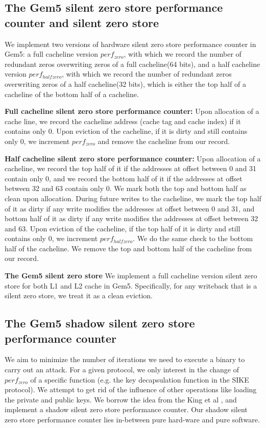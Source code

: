 \documentclass{iacrtrans}
\begin{document}
\subsection{The Gem5 silent zero store performance counter and silent zero store} 
We implement two versions of hardware silent zero store performance counter in Gem5: a full cacheline version $perf_{zero}$, with which we record the number of redundant zeros overwriting zeros of a full cacheline(64 bits), and a half cacheline version $perf_{halfzero}$, with which we record the number of redundant zeros overwriting zeros of a half cacheline(32 bits), which is either the top half of a cacheline of the bottom half of a cacheline.

\textbf{Full cacheline silent zero store performance counter: }Upon allocation of a cache line, we record the cacheline address (cache tag and cache index) if it contains only 0. Upon eviction of the cacheline, if it is dirty and still contains only 0, we increment $perf_{zero}$ and remove the cacheline from our record.

\textbf{Half cacheline silent zero store performance counter: }Upon allocation of a cacheline, we record the top half of it if the addresses at offset between 0 and 31 contain only 0, and we record the bottom half of it if the addresses at offset between 32 and 63 contain only 0. We mark both the top and bottom half as clean upon allocation. During future writes to the cacheline, we mark the top half of it as dirty if any write modifies the addresses at offset between 0 and 31, and bottom half of it as dirty if any write modifies the addresses at offset between 32 and 63. Upon eviction of the cacheline, if the top half of it is dirty and still contains only 0, we increment $perf_{halfzero}$. We do the same check to the bottom half of the cacheline. We remove the top and bottom half of the cacheline from our record. 

\textbf{The Gem5 silent zero store}
We implement a full cacheline version silent zero store for both L1 and L2 cache in Gem5. Specifically, for any writeback that is a silent zero store, we treat it as a clean eviction.

\subsection{The Gem5 shadow silent zero store performance counter} 
We aim to minimize the number of iterations we need to execute a binary to carry out an attack. For a given protocol, we only interest in the change of $perf_{zero}$ of a specific function (e.g. the key decapsulation function in the SIKE protocol). We attempt to get rid of the influence of other operations like loading the private and public keys. We borrow the idea from the King et al \cite{king2008designing}, and implement a shadow silent zero store performance counter. Our shadow silent zero store performance counter lies in-between pure hard-ware and pure software. 
\end{document}
